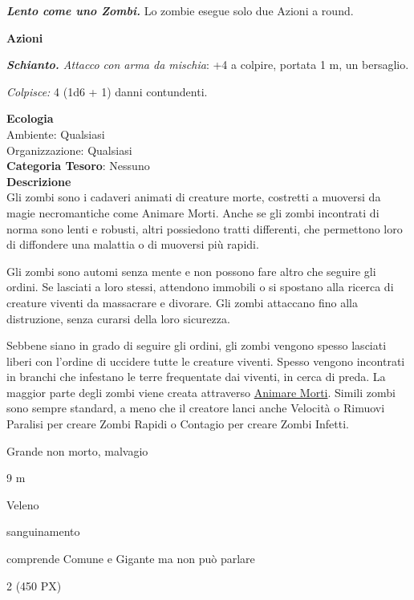 \begin{multicols}{2}
{\emph{\textbf{Lento come uno Zombi.}} Lo zombie esegue solo due Azioni a round.

\textbf{Azioni}

\emph{\textbf{Schianto.} Attacco con arma da mischia}: +4 a colpire, portata 1 m, un bersaglio.

\emph{Colpisce:} 4 (1d6 + 1) danni contundenti.

\textbf{Ecologia}\\
Ambiente: Qualsiasi\\
Organizzazione: Qualsiasi\\
\textbf{Categoria Tesoro}: Nessuno\\
\textbf{Descrizione}\\
Gli zombi sono i cadaveri animati di creature morte, costretti a muoversi da magie necromantiche come Animare Morti. Anche se gli zombi incontrati di norma sono lenti e robusti, altri possiedono tratti differenti, che permettono loro di diffondere una malattia o di muoversi più rapidi.

Gli zombi sono automi senza mente e non possono fare altro che seguire gli ordini. Se lasciati a loro stessi, attendono immobili o si spostano alla ricerca di creature viventi da massacrare e divorare. Gli zombi attaccano fino alla distruzione, senza curarsi della loro sicurezza.

Sebbene siano in grado di seguire gli ordini, gli zombi vengono spesso lasciati liberi con l'ordine di uccidere tutte le creature viventi. Spesso vengono incontrati in branchi che infestano le terre frequentate dai viventi, in cerca di preda. La maggior parte degli zombi viene creata attraverso \hyperlink{Animare Morti}{Animare Morti}. Simili zombi sono sempre standard, a meno che il creatore lanci anche Velocità o Rimuovi Paralisi per creare Zombi Rapidi o Contagio per creare Zombi Infetti.

\begin{description}[noitemsep, topsep=0pt, parsep=0pt, partopsep=0pt, itemsep=1pt, leftmargin=2.35cm,  labelwidth=2.2cm, itemindent=0cm, listparindent=0pt] %
\setlength{\baselineskip}{10pt}
\item[\textbf{Taglia/Tipo}] Grande non morto, malvagio
\item[\textbf{Caratt.}] 
\item[\textbf{Punti Ferita}] 
\item[\textbf{Movimento}] 9 m
\item[\textbf{Tiri Salvez.}] 
\item[\textbf{Imm. Danni}] Veleno
\item[\textbf{Immunità}] sanguinamento
\item[\textbf{Sensi}] 
\item[\textbf{Linguaggi}] comprende Comune e Gigante ma non può parlare
\item[\textbf{Sfida}] 2 (450 PX)
\end{description}
\smallskip

}
\end{multicols}
